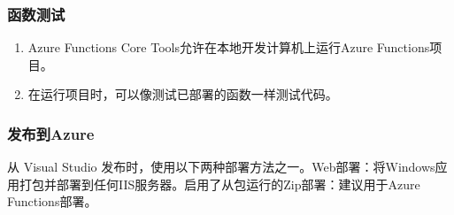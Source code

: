 \documentclass[11pt]{article}
\begin{document}
\subsubsection{函数测试} 
\begin{enumerate}
	\item Azure Functions Core Tools允许在本地开发计算机上运行Azure Functions项目。
	\item 在运行项目时，可以像测试已部署的函数一样测试代码。
\end{enumerate}	

\subsubsection{发布到Azure} 
从 Visual Studio 发布时，使用以下两种部署方法之一。Web部署：将Windows应用打包并部署到任何IIS服务器。启用了从包运行的Zip部署：建议用于Azure Functions部署。
\end{document}
